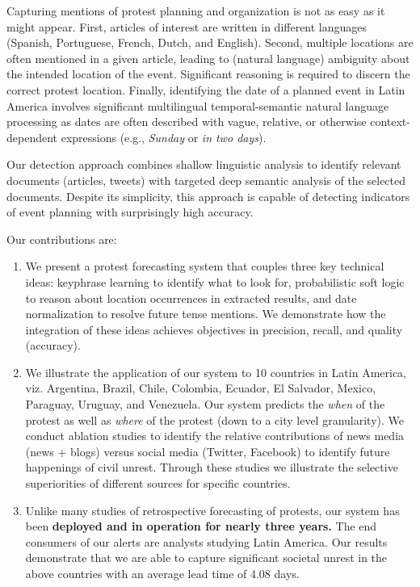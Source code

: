 Capturing mentions of protest planning and organization 
is not as easy as it might appear. First, articles of interest are written in
different languages (Spanish, Portuguese, French, Dutch, and English). 
Second, multiple locations are often mentioned in a given article, leading
to (natural language) ambiguity about the intended location of the event.
Significant reasoning is required to discern the correct protest location.
Finally, identifying the date of a planned event in Latin America involves significant multilingual temporal-semantic natural language processing as dates are often described with vague, relative, or otherwise
context-dependent expressions (e.g., {\em Sunday} or {\em in two days}).


Our detection approach combines shallow linguistic analysis to identify relevant
documents (articles, tweets) with targeted deep semantic analysis of the selected documents. Despite its simplicity, this approach is capable of detecting indicators of event planning with surprisingly high accuracy.

Our contributions are:

\iffalse
\begin{figure}
    \texttt{[image: alertstructure]}
    \caption{An example warning (left) and GSR event (right).}
    \label{fig:alertstructure}
\end{figure}
\fi

\begin{enumerate}
\item We present a protest forecasting system that couples three key technical ideas:
keyphrase learning to identify what to look for, probabilistic soft logic to reason about location occurrences in extracted results, and 
date normalization to resolve future tense mentions. We demonstrate how the integration of these ideas achieves objectives in precision,
recall, and quality (accuracy).
\item We illustrate the application of our system to 10 countries in Latin America, viz. Argentina, Brazil, Chile, Colombia, Ecuador, El Salvador, Mexico, Paraguay, Uruguay, and Venezuela. Our system predicts the {\it when} of the protest
as well as {\it where} of the protest (down to a city level granularity).
We conduct ablation studies to identify the 
relative contributions of news media (news + blogs) versus social media (Twitter, Facebook) to identify future happenings of
civil unrest. Through these studies we illustrate the selective superiorities of different sources for specific countries.
\item Unlike many studies of retrospective forecasting of protests,
our system has been {\bf deployed and in operation for nearly three years.}
The end consumers of our alerts are analysts studying Latin America.
Our results demonstrate that we are able to 
capture significant societal unrest in the above countries with an average lead time of 4.08 days. 
\end{enumerate}
